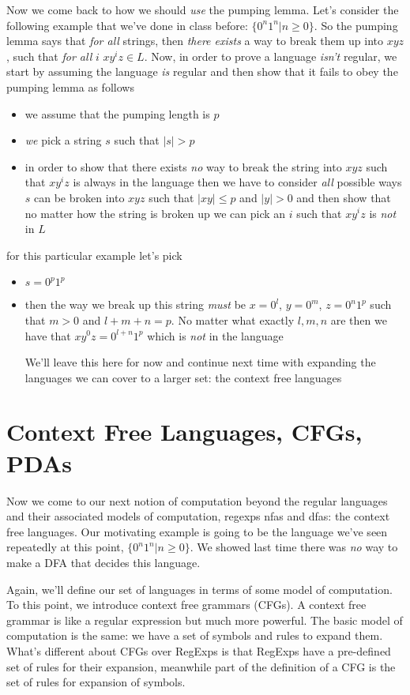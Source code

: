 \documentclass[11pt]{article}
\begin{document}
Now we come back to how we should \emph{use} the pumping lemma. Let's consider the following example that we've done in class before: $\{0^n1^n | n \geq 0\}$. So the pumping lemma says that \emph{for all} strings, then \emph{there exists} a way to break them up into $xyz$, such that \emph{for all} $i$ $xy^iz \in L$. Now, in order to prove a language \emph{isn't} regular, we start by assuming the language \emph{is} regular and then show that it fails to obey the pumping lemma as follows

\begin{itemize}
\item we assume that the pumping length is $p$
\item \emph{we} pick a string $s$ such that $|s| > p$
\item in order to show that there exists \emph{no} way to break the string into $xyz$ such that $xy^iz$ is always in the language then we have to consider \emph{all} possible ways $s$ can be broken into $xyz$ such that $|xy| \le p$ and $|y| > 0$ and then show that no matter how the string is broken up we can pick an $i$ such that $xy^iz$ is \emph{not} in $L$
\end{itemize}

for this particular example let's pick
\begin{itemize}
\item $s = 0^p1^p$
\item then the way we break up this string \emph{must} be $x=0^l$, $y=0^m$, $z=0^n1^p$ such that $m > 0$ and $l + m + n = p$. No matter what exactly $l,m,n$ are then we have that $xy^0z = 0^{l+n}1^p$ which is \emph{not} in the language

We'll leave this here for now and continue next time with expanding the languages we can cover to a larger set: the context free languages
\end{itemize}
\section{Context Free Languages, CFGs, PDAs}
\label{sec-6}
Now we come to our next notion of computation beyond the regular languages and their associated models of computation, regexps nfas and dfas: the context free languages. Our motivating example is going to be the language we've seen repeatedly at this point, $\{0^n1^n | n \geq 0\}$. We showed last time there was \emph{no} way to make a DFA that decides this language.

Again, we'll define our set of languages in terms of some model of computation. To this point, we introduce context free grammars (CFGs). A context free grammar is like a regular expression but much more powerful. The basic model of computation is the same: we have a set of symbols and rules to expand them. What's different about CFGs over RegExps is that RegExps have a pre-defined set of rules for their expansion, meanwhile part of the definition of a CFG is the set of rules for expansion of symbols. 
\end{document}
